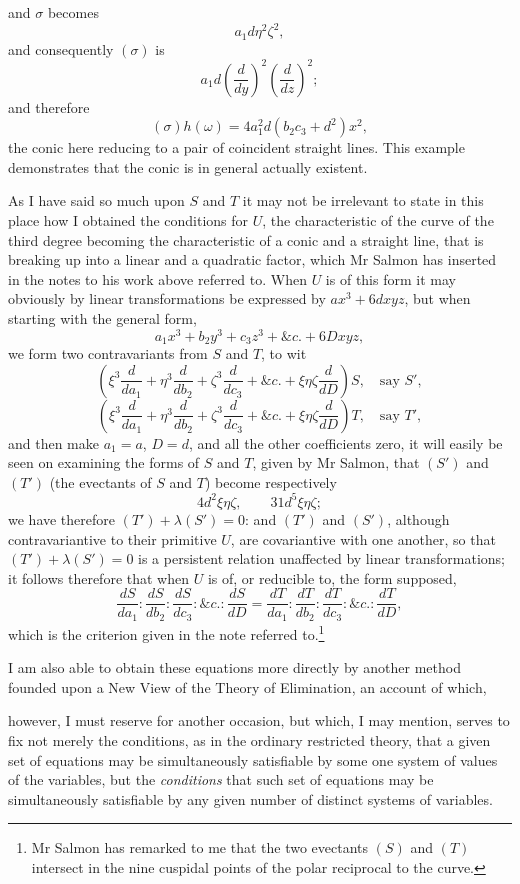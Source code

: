 \documentclass[11pt]{article}
\newcommand{\sourcepage}[1]{\marginpar{\scriptsize p.~#1}}
\begin{document}
{{\sourcepage{333}
and $\sigma$ becomes
\[
a_1d\eta^2\zeta^2,
\]
and consequently $(\sigma)$ is
\[
a_1d\left(\frac{d}{dy}\right)^2\left(\frac{d}{dz}\right)^2;
\]
and therefore
\[
(\sigma)h(\omega)=4a_1^2d(b_2c_3+d^2)x^2,
\]
the conic here reducing to a pair of coincident straight lines. This example demonstrates that the conic is in general actually existent.

As I have said so much upon $S$ and $T$ it may not be irrelevant to state in this place how I obtained the conditions for $U$, the characteristic of the curve of the third degree becoming the characteristic of a conic and a straight line, that is breaking up into a linear and a quadratic factor, which Mr Salmon has inserted in the notes to his work above referred to. When $U$ is of this form it may obviously by linear transformations be expressed by $ax^3+6dxyz$, but when starting with the general form,
\[
a_1x^3+b_2y^3+c_3z^3+\&c.+6Dxyz,
\]
we form two contravariants from $S$ and $T$, to wit
\[
\left(\xi^3\frac{d}{da_1}+\eta^3\frac{d}{db_2}
+\zeta^3\frac{d}{dc_3}+\&c.+\xi\eta\zeta\frac{d}{dD}\right)S,\quad\text{say }S',
\]
\[
\left(\xi^3\frac{d}{da_1}+\eta^3\frac{d}{db_2}
+\zeta^3\frac{d}{dc_3}+\&c.+\xi\eta\zeta\frac{d}{dD}\right)T,\quad\text{say }T',
\]
and then make $a_1=a$, $D=d$, and all the other coefficients zero, it will easily be seen on examining the forms of $S$ and $T$, given by Mr Salmon, that $(S')$ and $(T')$ (the evectants of $S$ and $T$) become respectively
\[
4d^2\xi\eta\zeta,\qquad 31d^5\xi\eta\zeta;
\]
we have therefore $(T')+\lambda(S')=0$: and $(T')$ and $(S')$, although contravariantive to their primitive $U$, are covariantive with one another, so that $(T')+\lambda(S')=0$ is a persistent relation unaffected by linear transformations; it follows therefore that when $U$ is of, or reducible to, the form supposed,
\[
\frac{dS}{da_1}:\frac{dS}{db_2}:\frac{dS}{dc_3}:\&c.:\frac{dS}{dD}
=
\frac{dT}{da_1}:\frac{dT}{db_2}:\frac{dT}{dc_3}:\&c.:\frac{dT}{dD},
\]
which is the criterion given in the note referred to.\footnote{Mr Salmon has remarked to me that the two evectants $(S)$ and $(T)$ intersect in the nine cuspidal points of the polar reciprocal to the curve.}

I am also able to obtain these equations more directly by another method founded upon a New View of the Theory of Elimination, an account of which,

\sourcepage{334}
however, I must reserve for another occasion, but which, I may mention, serves to fix not merely the conditions, as in the ordinary restricted theory, that a given set of equations may be simultaneously satisfiable by some one system of values of the variables, but the \emph{conditions} that such set of equations may be simultaneously satisfiable by any given number of distinct systems of variables.

}}
\end{document}
